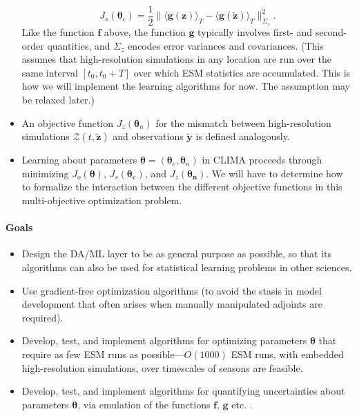 \documentclass{article}
\renewcommand{\vec}[1]{\boldsymbol{{#1}}}
\begin{document}
\begin{itemize}
    \begin{equation}\label{e:obj_hr}
    J_s(\vec{\theta}_c)=\frac12\| \langle \vec{g}(\vec{z})  \rangle_T - \langle \vec{g}(\vec{\tilde z})
    \rangle_T \|_{\Sigma_z}^2.
    \end{equation}
    Like the function $\vec{f}$ above, the function $\vec{g}$  typically involves first- and second-order quantities, and $\Sigma_z$ encodes error variances and covariances. (This assumes that high-resolution simulations in any location are run over the same interval $[t_0, t_0+T]$ over which ESM statistics are accumulated. This is how we will implement the learning algorithms for now. The assumption may be relaxed later.) 
    \item An objective function $J_z(\vec{\theta}_n)$ for the mismatch between high-resolution simulations  $\mathcal{Z}(t, \vec{\tilde z})$ and observations $\vec{\tilde y}$ is defined analogously. 
    \item Learning about parameters $\vec{\theta} = (\vec{\theta}_c, \vec{\theta}_n)$ in CLIMA proceeds through minimizing $J_o(\vec{\theta})$, $J_s(\vec{\theta_c})$, and $J_z(\vec{\theta_n})$. We will have to determine how to formalize the interaction between the different objective functions in this multi-objective optimization problem.
\end{itemize}

\paragraph{Goals}
\begin{itemize}
    \item Design the DA/ML layer to be as general purpose as possible, so that its algorithms can also be used for statistical learning problems in other sciences.
    \item Use gradient-free optimization algorithms (to avoid the stasis in model development that often arises when manually manipulated adjoints are required).
    \item Develop, test, and implement algorithms for optimizing parameters $\vec{\theta}$ that require as few ESM runs as possible---$O(1000)$ ESM runs, with embedded high-resolution simulations, over timescales of seasons are feasible. 
    \item Develop, test, and implement algorithms for quantifying uncertainties about parameters $\vec{\theta}$, via emulation of the functions $\vec{f}$, $\vec{g}$ etc. \citep{Kennedy01a,OHagan06a}.
\end{itemize}
\end{document}
